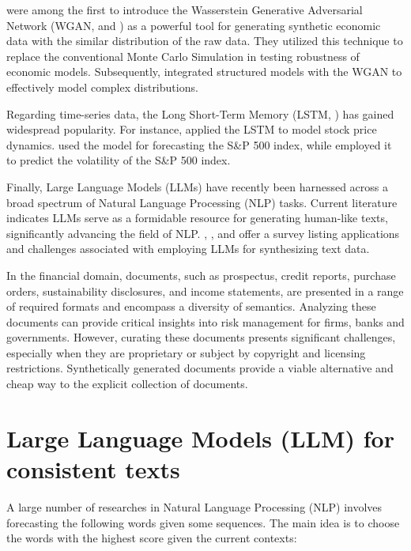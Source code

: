 \cite{athey2021using} were among the first to introduce the Wasserstein Generative Adversarial Network (WGAN, \cite{arjovsky2017wasserstein} and \cite{goodfellow2020generative}) as a powerful tool for generating synthetic economic data with the similar distribution of the raw data. They utilized this technique to replace the conventional Monte Carlo Simulation in testing robustness of economic models. Subsequently, \cite{kaji2023adversarial} integrated structured models with the WGAN to effectively model complex distributions.  

Regarding time-series data, the Long Short-Term Memory (LSTM, \cite{hochreiter1997long}) has gained widespread popularity. For instance, \cite{carvajal2022synthetic} applied the LSTM to model stock price dynamics. \cite{fischer2018deep} used the model for forecasting the S\&P 500 index, while \cite{liu2019novel} employed it to predict the volatility of the S\&P 500 index. 

Finally, Large Language Models (LLMs) have recently been harnessed across a broad spectrum of Natural Language Processing (NLP) tasks. Current literature indicates LLMs serve as a formidable resource for generating human-like texts, significantly advancing the field of NLP. \cite{potluru2023synthetic}, \cite{assefa2020generating}, and \cite{guo2024generative} offer a survey listing applications and challenges associated with employing LLMs for synthesizing text data. 

In the financial domain, documents, such as prospectus, credit reports, purchase orders, sustainability disclosures, and income statements, are presented in a range of required formats and encompass a diversity of semantics. Analyzing these documents can provide critical insights into risk management for firms, banks and governments. However, curating these documents presents significant challenges, especially when they are proprietary or subject by copyright and licensing restrictions. Synthetically generated documents provide a viable alternative and cheap way to the explicit collection of documents.


\section{Large Language Models (LLM) for consistent texts}\label{ch3:sec:llm}
A large number of researches in Natural Language Processing (NLP) involves forecasting the following words given some sequences. The main idea is to choose the words with the highest score given the current contexts:


